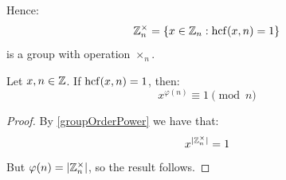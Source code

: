 \documentclass[../main.tex]{subfiles}
\begin{document}
Hence:
\[
  \mathbb{Z}^{\times}_{n} = \{x \in \mathbb{Z}_n : \operatorname{hcf}(x, n) = 1\}
\]
is a group with operation $\times_n$.

\begin{theorem}
  Let $x, n \in \mathbb{Z}$.
  If $\operatorname{hcf}(x, n) = 1$, then:
  \[
    x^{\varphi(n)} \equiv 1 \pmod{n}
  \]
\end{theorem}
\begin{proof}
  By \cref{groupOrderPower} we have that:
  \[
    x^{|\mathbb{Z}^{\times}_{n}|} = 1
  \]
  But $\varphi(n) = |\mathbb{Z}^{\times}_{n}|$, so the result follows.
\end{proof}
\end{document}
